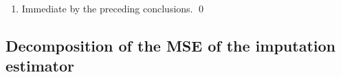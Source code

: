 \begin{enumerate}
\begin{eqnarray*}
    \\
    & = &
        \underset{i\,\in\,U}{\sum}\;\,
            \dfrac{S_{i}}{\pi_{i}}
            \cdot
            \underset{j \in \mathcal{C}_{i}}{\sum}\;
            (1 \overset{{\color{white}.}}{-} R_{ij})
            \cdot
            \alpha_{ij}
            \cdot
            E_{Y}\!\left[\;
                Y^{*}_{ij} \overset{{\color{white}.}}{-} Y_{ij}
                \left\vert\!
                \begin{array}{c} s,s_{R}, \\ \Xobs \end{array}
                \right.
                \!\!\right]
    \\
    & = &
        \underset{i\,\in\,s}{\sum}\;\,
            \dfrac{1}{\pi_{i}}
            \left(\;
                \underset{j \in (\mathcal{C}_{i})_{M}}{\sum}
                \alpha_{ij}
                \cdot
                E_{Y}\!\left[\;
                    Y^{*}_{ij} \overset{{\color{white}.}}{-} Y_{ij}
                    \left\vert\!
                    \begin{array}{c} s,s_{R}, \\ \Xobs \end{array}
                    \right.
                    \!\!\right]
                \,\right),
    \end{eqnarray*}
    as required.
\item
    Immediate by the preceding conclusions.
    \qed
\end{enumerate}


\vskip 1.0cm
\subsection{Decomposition of the MSE of the imputation estimator}
\setcounter{theorem}{0}



